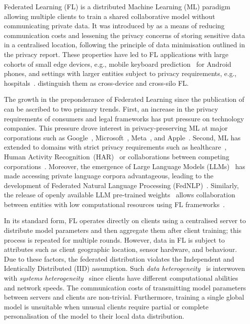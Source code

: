 Federated Learning (FL) is a distributed Machine Learning (ML) paradigm allowing multiple clients to train a shared collaborative model without communicating private data. It was introduced by \citet{FedAvg} as a means of reducing communication costs and lessening the privacy concerns of storing sensitive data in a centralised location, following the principle of data minimisation outlined in the \citet{White_House_Report} privacy report. These properties have led to FL applications with large cohorts of small edge devices, e.g., mobile keyboard prediction~\citep{GoogleKeyboard} for Android phones, and settings with larger entities subject to privacy requirements, e.g., hospitals~\citep{FLmedicine}. \citet{AdvancedAndOpenProblems} distinguish them as cross-device and cross-silo FL\@.

The growth in the preponderance of Federated Learning since the publication of \citet{FedAvg} can be ascribed to two primary trends. First, an increase in the privacy requirements of consumers and legal frameworks has put pressure on technology companies. This pressure drove interest in privacy-preserving ML at major corporations such as Google~\citep{FedAvg,GoogleKeyboard,tensorflowfederated,PracticalPrivateFLkairouz21b}, Microsoft~\citep{FLINT,Flute}, Meta~\citep{PAPAYA,FedBuff}, and Apple~\citep{AppleFL}. Second, ML has extended to domains with strict privacy requirements such as healthcare~\citep{FLmedicine,FutureOfHealth,BigDataCancer}, Human Activity Recognition~(HAR)~\citep{HARusingFL_2018,ClusterFL} or collaborations between competing corporations~\citep{SustainableIncentive,TowardsFairPrivacyPreservingFL}. Moreover, the emergence of Large Language Models (LLMs)~\citep{OpportunitiesAndRisksLLM} has made accessing private language corpora advantageous, leading to the development of Federated Natural Language Processing (FedNLP)~\citep{FedNLP}. Similarly, the release of openly available LLM pre-trained weights~\citep{LLaMA} allows collaboration between entities with low computational resources using FL frameworks~\citep{Flower,FedScale,FedML}.

In its standard form, FL operates directly on clients using a centralised server to distribute model parameters and then aggregate them after client training; this process is repeated for multiple rounds. However, data in FL is subject to attributes such as client geographic location, sensor hardware, and behaviour. Due to these factors, the federated distribution violates the Independent and Identically Distributed (IID) assumption. Such \emph{data heterogeneity}~\citep[sec. 3.1]{AdvancedAndOpenProblems} is interwoven with \emph{systems heterogeneity}~\citep[sec. 7.2]{AdvancedAndOpenProblems} since clients have different computational abilities and network speeds. The communication costs of transmitting model parameters between servers and clients are non-trivial. Furthermore, training a single global model is unsuitable when unusual clients require partial or complete personalisation of the model to their local data distribution.

